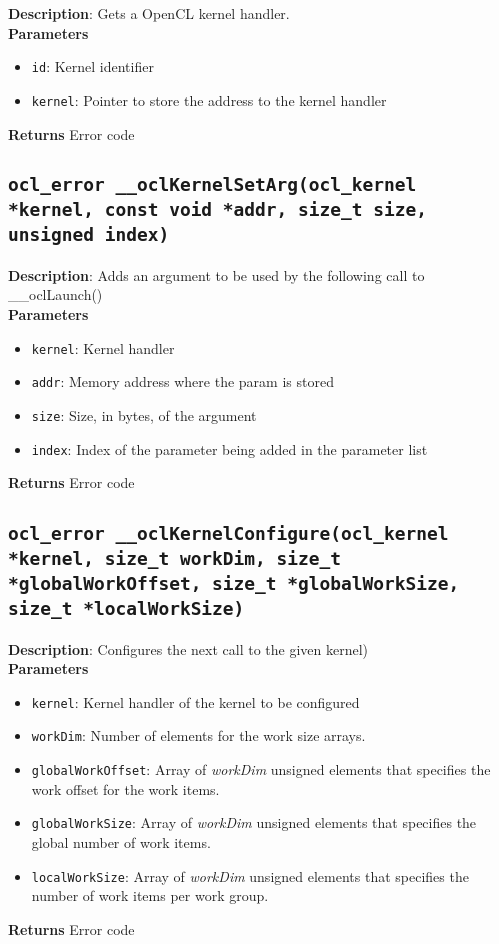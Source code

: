 \textbf{Description}: Gets a OpenCL kernel handler. \\
\textbf{Parameters}
\begin{itemize}
  \item \texttt{id}: Kernel identifier
  \item \texttt{kernel}: Pointer to store the address to the kernel handler
\end{itemize}
\textbf{Returns} Error code


\subsection{\texttt{ocl\_error \_\_oclKernelSetArg(ocl\_kernel *kernel, const void *addr, size\_t size, unsigned index)}}

\textbf{Description}: Adds an argument to be used by the following call to \_\_oclLaunch()\\
\textbf{Parameters}
\begin{itemize}
  \item \texttt{kernel}: Kernel handler
  \item \texttt{addr}: Memory address where the param is stored
  \item \texttt{size}: Size, in bytes, of the argument
  \item \texttt{index}: Index of the parameter being added in the parameter list
\end{itemize}
\textbf{Returns} Error code


\subsection{\texttt{ocl\_error \_\_oclKernelConfigure(ocl\_kernel *kernel, size\_t workDim, size\_t *globalWorkOffset, size\_t *globalWorkSize, size\_t *localWorkSize)}}

\textbf{Description}: Configures the next call to the given kernel) \\
\textbf{Parameters}
\begin{itemize}
  \item \texttt{kernel}: Kernel handler of the kernel to be configured
  \item \texttt{workDim}: Number of elements for the work size arrays.
  \item \texttt{globalWorkOffset}: Array of \emph{workDim} unsigned elements that specifies the work 
    offset for the work items.
  \item \texttt{globalWorkSize}: Array of \emph{workDim} unsigned elements that specifies the global 
    number of work items.
  \item \texttt{localWorkSize}: Array of \emph{workDim} unsigned elements that specifies the number 
    of work items per work group.
\end{itemize}
\textbf{Returns} Error code

